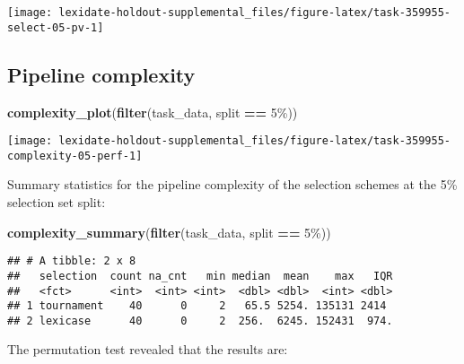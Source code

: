 \documentclass[
]{book}
\newenvironment{Shaded}{\begin{snugshade}}{\end{snugshade}}
\newcommand{\FunctionTok}[1]{\textcolor[rgb]{0.13,0.29,0.53}{\textbf{#1}}}
\newcommand{\NormalTok}[1]{#1}
\newcommand{\SpecialCharTok}[1]{\textcolor[rgb]{0.81,0.36,0.00}{\textbf{#1}}}
\newcommand{\StringTok}[1]{\textcolor[rgb]{0.31,0.60,0.02}{#1}}
\begin{document}
\texttt{[image: lexidate-holdout-supplemental\_files/figure-latex/task-359955-select-05-pv-1]}

\hypertarget{pipeline-complexity-10}{%
\subsection{Pipeline complexity}\label{pipeline-complexity-10}}

\begin{Shaded}
\begin{Highlighting}[]
\FunctionTok{complexity\_plot}\NormalTok{(}\FunctionTok{filter}\NormalTok{(task\_data, split }\SpecialCharTok{==} \StringTok{\textquotesingle{}5\%\textquotesingle{}}\NormalTok{))}
\end{Highlighting}
\end{Shaded}

\texttt{[image: lexidate-holdout-supplemental\_files/figure-latex/task-359955-complexity-05-perf-1]}

Summary statistics for the pipeline complexity of the selection schemes at the 5\% selection set split:

\begin{Shaded}
\begin{Highlighting}[]
\FunctionTok{complexity\_summary}\NormalTok{(}\FunctionTok{filter}\NormalTok{(task\_data, split }\SpecialCharTok{==} \StringTok{\textquotesingle{}5\%\textquotesingle{}}\NormalTok{))}
\end{Highlighting}
\end{Shaded}

\begin{verbatim}
## # A tibble: 2 x 8
##   selection  count na_cnt   min median  mean    max   IQR
##   <fct>      <int>  <int> <int>  <dbl> <dbl>  <int> <dbl>
## 1 tournament    40      0     2   65.5 5254. 135131 2414 
## 2 lexicase      40      0     2  256.  6245. 152431  974.
\end{verbatim}

The permutation test revealed that the results are:
\end{document}
